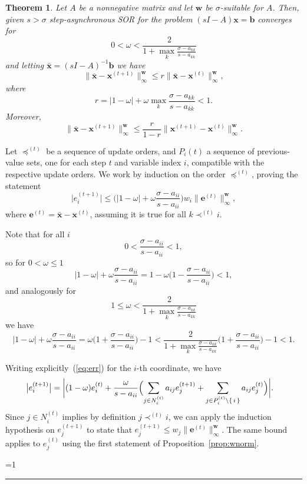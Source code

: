 \documentclass{article}
\newcommand{\w}{{\bm w}}
\newcommand{\x}{{\bm x}}
\newcommand{\1}{\mathbf 1}
\newtheorem{theorem}{Theorem}
\newcounter{noqed}
\newcommand{\qed}{ \ifmmode\mbox{ }\fi\rule[-.05em]{.3em}{.7em}\setcounter{noqed}{0}}
\newenvironment{proof}[1][{}]{\noindent{\bf Proof#1. }\setcounter{noqed}{1}}{\ifnum\value{noqed}=1\qed\fi\par\medskip}
\begin{document}
\begin{theorem}
\label{teo:conv}
Let $A$ be a nonnegative matrix and let $\w$
be $\sigma$-suitable for $A$.
Then, given $s>\sigma$ step-asynchronous SOR for the problem $(s  I- A)\x=\bm b$
converges for 
\[
0<\omega< \frac2{\displaystyle 1+\max_k\frac{\sigma -a_{kk}}{s-a_{kk}}} \]
 and letting $\bar\x=(sI-A)^{-1}\bm b$ we have
\[
\big\|\bar\x - \x^{(t+1)}\bigr\|_\infty^\w
\leq r\bigl\|\bar\x -
\x^{(t)}\bigr\|_\infty^\w,
\]
where 
\[
r=|1-\omega| +\omega\max_k\frac{\sigma -a_{kk}}{s-a_{kk}}<1.
\]
Moreover, 
\[
\bigl\|\bar\x - \x^{(t+1)}\bigr\|_\infty^\w
\leq\frac r{1-r}
\bigl\|\x^{(t+1)} - \x^{(t)}\bigr\|_\infty^\w.
\]
\end{theorem}
\begin{proof}
Let $\preceq^{(t)}$ be a sequence of update orders, and 
$P_i{(t)}$ a sequence of previous-value sets, one for each step $t$ and
variable index $i$, compatible with the respective update orders.
We work by induction on the order
$\preceq^{(t)}$, proving the statement
\begin{equation}
\label{eq:ind}
\bigl| e_i^{(t+1)}\bigr|\leq\biggl( 
|1-\omega|+
\omega\frac{\sigma-a_{ii}}{s-a_{ii}}\biggr)w_i\bigl\|\bm
e^{(t)}\bigr\|_\infty^\w,
\end{equation}
where $\bm e^{(t)}=\bar\x - \x^{(t)}$, assuming it is true for all
$k\prec^{(t)}i$.

Note that for all $i$
\[
0<\frac{\sigma-a_{ii}}{s-a_{ii}}<1,
\]
so for $0<\omega\leq 1$
\[
|1-\omega|+
\omega\frac{\sigma-a_{ii}}{s-a_{ii}} = 1 -
\omega\biggl(1-\frac{\sigma-a_{ii}}{s-a_{ii}}\biggr)<1,
\]
and analogously for
\[
1\leq\omega<\frac2{\displaystyle 1+ \max_k\frac{\sigma -a_{kk}}{s-a_{kk}}} \]
we have
\[
|1-\omega|+
\omega\frac{\sigma-a_{ii}}{s-a_{ii}} = 
\omega\biggl(1+\frac{\sigma-a_{ii}}{s-a_{ii}}\biggr)-1<
\frac2{\displaystyle 1+\max_k\frac{\sigma
-a_{kk}}{s-a_{kk}}}\biggl(1+\frac{\sigma-a_{ii}}{s-a_{ii}}\biggr)-1<1.
\]


Writing explicitly~(\ref{eq:err}) for the $i$-th coordinate, we have
\begin{align*}
\bigl|e_i^{(t+1)}\bigr| &= \biggl|(1-\omega)e_i^{(t)}+
\frac\omega{s -a_{ii}}\Bigl(\sum_{j\in N_i^{(t)}} a_{ij}e_j^{(t+1)}
+\sum_{j\in P_i^{(t)}\setminus\{\,i\,\}} a_{ij}e_j^{(t)}\Bigr) 
\biggr|.
\end{align*}
Since $j\in N_i^{(t)}$ implies by definition $j\prec^{(t)}i$, we can apply the
induction hypothesis on $e_j^{(t+1)}$ to state that $e_j^{(t+1)}\leq w_j\bigl\|\bm e^{(t)}\bigr\|_\infty^\w$.
The same bound applies to $e_j^{(t)}$ using
the first statement of Proposition~\ref{prop:wnorm}. 


\end{proof}
\end{document}
